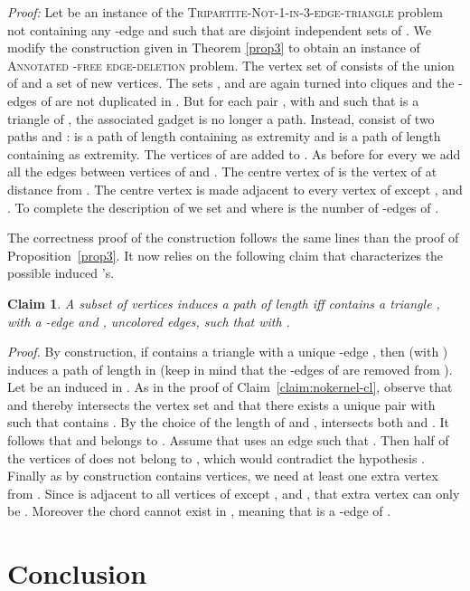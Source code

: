 \documentclass[11pt]{article}
\newenvironment{proof}{\noindent\textit{Proof: }}{{\hfill }}
\newtheorem{claim}[lemma]{Claim}
\newcommand{\tgbc}{\textsc{Tripartite-Not-1-in-3-edge-triangle}}
\begin{document}
\begin{proof}
Let  be an instance of the \tgbc{} problem not containing any -edge and such that  are disjoint independent sets of . We modify the construction given in Theorem \ref{prop3} to obtain an instance  of \textsc{Annotated -free edge-deletion} problem. The vertex set  of  consists of the union of  and a set  of new vertices. The sets ,  and  are again turned into cliques and the -edges of  are not duplicated in . But for each pair , with  and  such that  is a triangle of , the associated gadget  is no longer a path. Instead,  consist of two paths  and :  is a path of length  containing  as extremity and  is a path of length  containing  as extremity. The vertices of  are added to . As before for every  we add all the edges between vertices of  and . The centre vertex  of  is the vertex of  at distance  from . The centre vertex is made adjacent to every vertex of  except ,  and . To complete the description of  we set  and  where  is the number of -edges of .

The correctness proof of the construction follows the same lines than the proof of Proposition~\ref{prop3}. It now relies on the following claim that characterizes the possible induced 's.

\begin{claim}
\label{claim:nokernel-pl}
A subset of vertices  induces a path of length  iff  contains a triangle ,  
with  a -edge and ,  uncolored edges, such that  with .
\end{claim}

\emph{Proof.} By construction, if  contains a triangle  with a unique -edge , then  (with ) induces a path of length  in  (keep in mind that the -edges of  are removed from ).
Let  be an induced  in . As in the proof of Claim~\ref{claim:nokernel-cl}, observe that  and thereby  intersects the vertex set  and that there exists a unique pair  with  such that  contains . By the choice of the length of  and ,  intersects both  and . It follows that  and  belongs to . Assume that  uses an edge  such that . Then half of the vertices of  does not belong to , which would contradict the hypothesis . Finally as by construction  contains  vertices, we need at least one extra vertex from . Since  is adjacent to all vertices of  except ,  and , that extra vertex can only be . Moreover the chord  cannot exist in , meaning that  is a -edge of .
\end{proof}
 
 \section{Conclusion}
 
\end{document}
